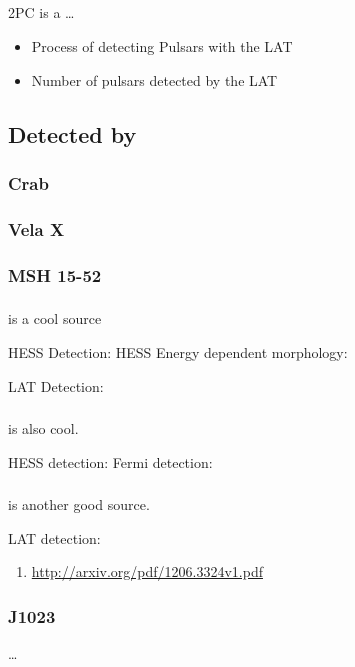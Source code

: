 \subsection{}
\subseclabel{2pc}

\Ac{2PC} is a \ldots
{}

\begin{itemize}
  \item Process of detecting Pulsars with the \ac{LAT}
  \item Number of pulsars detected by the \ac{LAT}
\end{itemize}

\subsection{ Detected by }

\subsubsection{Crab}

\subsubsection{Vela X}

\subsubsection{MSH 15-52}


\subsubsection{}

 is a cool source

HESS Detection: 
HESS Energy dependent morphology: \cite{aharonian_2006a_energy-dependent}

LAT Detection: \cite{grondin_2011_detection-pulsar}



\subsubsection{}

 is also cool.

HESS detection:  \cite{aharonian_2006a_h.e.s.s.-survey}
Fermi detection: \cite{slane_2010_fermi-detection}

\subsubsection{}

 is another good source.

LAT detection: \cite{rousseau_2012_fermi-lat-constraints}

\begin{enumerate}
  \item \url{http://arxiv.org/pdf/1206.3324v1.pdf}
\end{enumerate}

\subsubsection{J1023}

\ldots
